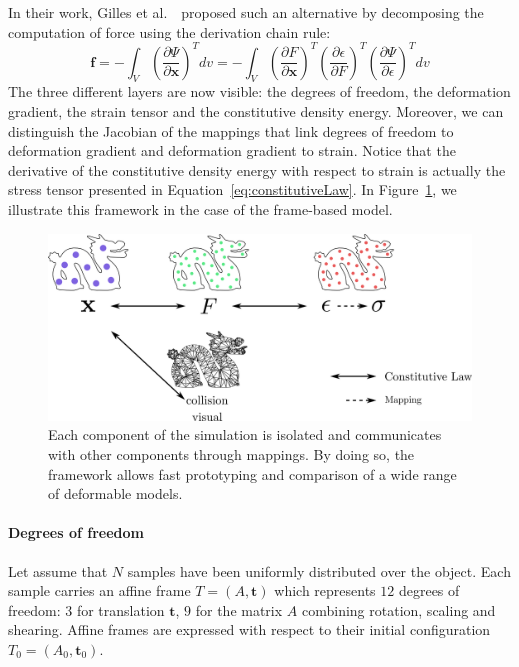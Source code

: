 In their work, Gilles et al.~\cite{Gilles2011}~proposed such an alternative by decomposing the computation of force using the derivation chain rule:
\begin{equation}
\label{eq:forceChainRule}
\displaystyle \mathbf{f} = -\int_{V} \left(\frac{\partial \Psi}{\partial \mathbf{x}}\right)^{T} dv
=
-\int_{V} \left(\frac{\partial F}{\partial \mathbf{x}}\right)^{T}
\left(\frac{\partial \epsilon}{\partial F}\right)^{T}
\left(\frac{\partial \Psi}{\partial \epsilon}\right)^{T} dv
\end{equation}
The three different layers are now visible: the degrees of freedom, the deformation gradient, the strain tensor and the constitutive density energy.
Moreover, we can distinguish the Jacobian of the mappings that link degrees of freedom to deformation gradient and deformation gradient to strain.
Notice that the derivative of the constitutive density energy with respect to strain is actually the stress tensor presented in Equation~\eqref{eq:constitutiveLaw}.
In Figure~\ref{fig:multiLayerFramework}, we illustrate this framework in the case of the frame-based model.
\begin{figure}[H]
\centering
\includegraphics[width=\linewidth]{./images/continuum_mechanics/multiLayeredFramework.png}
\caption[STAR mechanics: Multi-layer framework]{\label{fig:multiLayerFramework} Each component of the simulation is isolated and communicates with other components through mappings. By doing so, the framework allows fast prototyping and comparison of a wide range of deformable models.}
\end{figure}

\paragraph{Degrees of freedom} Let assume that $N$ samples have been uniformly distributed over the object. 
Each sample carries an affine frame $T=(A,\mathbf{t})$ which represents $12$ degrees of freedom: $3$ for translation $\mathbf{t}$, $9$ for the matrix $A$ combining rotation, scaling and shearing. 
Affine frames are expressed with respect to their initial configuration~$T_{0} = \left(A_{0}, \mathbf{t}_{0}\right)$.

